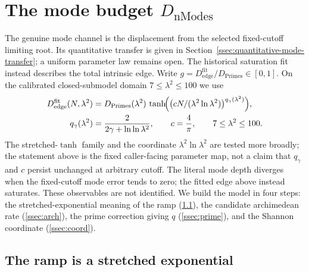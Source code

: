 \documentclass[11pt,a4paper]{article}
\begin{document}
\section{The mode budget $D_{\mathrm{nModes}}$}\label{sec:nmodes}

The genuine mode channel is the displacement from the selected
fixed-cutoff limiting root. Its quantitative transfer is given in
Section~\ref{ssec:quantitative-mode-transfer}; a uniform parameter law
remains open. The historical saturation fit instead describes the total
intrinsic edge. Write
$g=D_{\mathrm{edge}}^{\mathrm{fit}}/D_{\mathrm{Primes}}\in[0,1]$.
On the calibrated closed-submodel domain $7\le\lambda^2\le100$ we use
\begin{equation}\label{eq:nmodes}
\begin{aligned}
  D_{\mathrm{edge}}^{\mathrm{fit}}(N,\lambda^2)
    &=D_{\mathrm{Primes}}(\lambda^2)\,
      \tanh\!\Bigl(\bigl(cN/(\lambda^2\ln\lambda^2)\bigr)^{q_\gamma(\lambda^2)}\Bigr),\\
  q_\gamma(\lambda^2)&=\frac{2}{2\gamma+\ln\ln\lambda^2},
  \qquad c=\frac4\pi,\qquad 7\le\lambda^2\le100.
\end{aligned}
\end{equation}
The stretched-$\tanh$ family and the coordinate
$\lambda^2\ln\lambda^2$ are tested more broadly; the statement above is the
fixed caller-facing parameter map, not a claim that $q_\gamma$ and $c$ persist
unchanged at arbitrary cutoff. The literal mode depth diverges when
the fixed-cutoff mode error tends to zero; the fitted edge above instead
saturates. These observables are not identified. We build the model in four steps: the
stretched-exponential meaning of the ramp
(\ref{ssec:stretch}), the candidate archimedean rate (\ref{ssec:arch}), the prime
correction giving $q$ (\ref{ssec:prime}), and the Shannon coordinate
(\ref{ssec:coord}).

\subsection{The ramp is a stretched exponential}\label{ssec:stretch}
\end{document}
